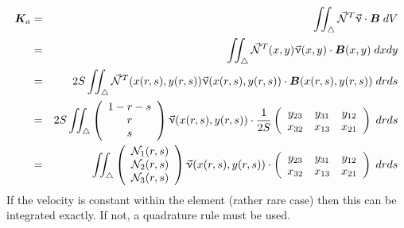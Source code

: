 \begin{eqnarray}
{\bm K}_a 
&=& \iint_\triangle \vec{{\mathcal{N}}}^T \vec{\upnu}\cdot {\bm B} \; dV \nonumber\\
&=& \iint_\triangle \vec{{\mathcal{N}}}^T(x,y) \vec{\upnu}(x,y)\cdot {\bm B}(x,y) \; dx dy \nonumber\\
&=& 2S \iint_\triangle \vec{{\mathcal{N}}}^T(x(r,s),y(r,s)) \vec{\upnu}(x(r,s),y(r,s))\cdot {\bm B}(x(r,s),y(r,s)) \; dr ds \nonumber\\
&=& 2S \iint_\triangle 
\left(
\begin{array}{c} 
1-r-s \\ r \\ s 
\end{array}
\right)
\vec{\upnu}(x(r,s),y(r,s))\cdot 
\frac{1}{2S}
\left(
\begin{array}{ccc}
y_{23} & y_{31} & y_{12} \\
x_{32} & x_{13} & x_{21}
\end{array}
\right)
\; dr ds \nonumber\\
&=&  \iint_\triangle 
\left(
\begin{array}{c} 
{\mathcal{N}}_1(r,s) \\ {\mathcal{N}}_2(r,s) \\ {\mathcal{N}}_3(r,s)
\end{array}
\right)
\vec{\upnu}(x(r,s),y(r,s))\cdot 
\left(
\begin{array}{ccc}
y_{23} & y_{31} & y_{12} \\
x_{32} & x_{13} & x_{21}
\end{array}
\right)
\; dr ds \nonumber
\end{eqnarray}
If the velocity is constant within the element (rather rare case) then this can be integrated exactly.
If not, a quadrature rule must be used. 


